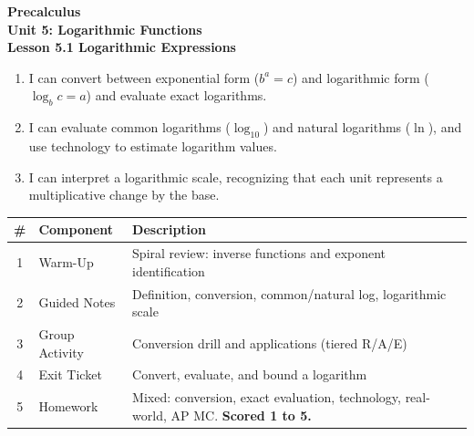 \documentclass[10pt]{article}
\begin{document}
\vspace{-0.8in}

\begin{center}
  {\color{white}\textbf{\LARGE Precalculus}}\\[4pt]
  {\color{skymid}\large\textbf{Unit 5: Logarithmic Functions}}\\[6pt]
  {\color{white}\textbf{\large Lesson 5.1 \quad Logarithmic Expressions}}
\end{center}

\vspace{0.22in}
\namedateperiod
\vspace{0.18in}

\begin{learningtargetbox}
\small
\begin{enumerate}[leftmargin=1.5em, itemsep=5pt]
  \item I can convert between exponential form ($b^a = c$) and logarithmic form
        ($\log_b c = a$) and evaluate exact logarithms.
  \item I can evaluate common logarithms ($\log_{10}$) and natural logarithms ($\ln$),
        and use technology to estimate logarithm values.
  \item I can interpret a logarithmic scale, recognizing that each unit represents a
        multiplicative change by the base.
\end{enumerate}
\end{learningtargetbox}

\vspace{0.14in}

\begin{tocbox}
\small
\renewcommand{\arraystretch}{1.5}
\begin{tabularx}{\linewidth}{@{} c l X @{}}
\rowcolor{sky}
\textbf{\#} & \textbf{Component} & \textbf{Description} \\
\midrule
1 & Warm-Up        & Spiral review: inverse functions and exponent identification \\
2 & Guided Notes   & Definition, conversion, common/natural log, logarithmic scale \\
3 & Group Activity & Conversion drill and applications (tiered R/A/E) \\
4 & Exit Ticket    & Convert, evaluate, and bound a logarithm \\
5 & Homework       & Mixed: conversion, exact evaluation, technology, real-world, AP MC. \textbf{Scored 1 to 5.} \\
\end{tabularx}
\end{tocbox}
\end{document}

